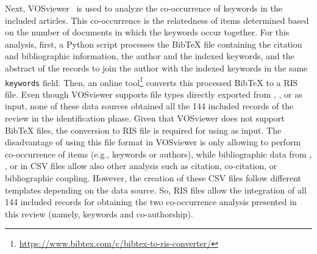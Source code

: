 Next, VOSviewer~\parencite{results:vosviewer:1,results:vosviewer:2} is used to analyze the co-occurrence of keywords in the included articles. This co-occurrence is the relatedness of items determined based on the number of documents in which the keywords occur together.
For this analysis, first, a Python script processes the BibTeX file containing the citation and bibliographic information, the author and the indexed keywords, and the abstract of the records to join the author with the indexed keywords in the same \texttt{keywords} field. Then, an online tool\footnote{\url{https://www.bibtex.com/c/bibtex-to-ris-converter/}} converts this processed BibTeX to a RIS file.
Even though VOSviewer supports file types directly exported from , , or  as input, none of these data sources obtained all the 144 included records of the review in the identification phase. Given that VOSviewer does not support BibTeX files, the conversion to RIS file is required for using as input.
The disadvantage of using this file format in VOSviewer is only allowing to perform co-occurrence of items (e.g., keywords or authors), while bibliographic data from , , or  in CSV files allow also other analysis such as citation, co-citation, or bibliographic coupling.
However, the creation of these CSV files follow different templates depending on the data source. So, RIS files allow the integration of all 144 included records for obtaining the two co-occurrence analysis presented in this review (namely, keywords and co-authorship).

